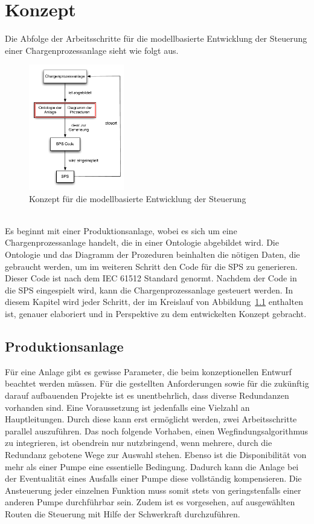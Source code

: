 
\chapter{Konzept} \label{chapter:architecture}
Die Abfolge der Arbeitsschritte für die modellbasierte Entwicklung der Steuerung einer Chargenprozessanlage sieht wie folgt aus.
\begin{figure}[h!]
		\centering
		\includegraphics[width=0.37\textwidth]{graphics/konzept/konzept_new.pdf}
		\caption{Konzept für die modellbasierte Entwicklung der Steuerung}
		\label{fig:konz_konzept_new}
\end{figure} \\
Es beginnt mit einer Produktionsanlage, wobei es sich um eine Chargenprozessanlage handelt, die in einer Ontologie abgebildet wird. Die Ontologie und das Diagramm der Prozeduren beinhalten die nötigen Daten, die gebraucht werden, um im weiteren Schritt den Code für die SPS zu generieren. Dieser Code ist nach dem IEC 61512 Standard genormt. Nachdem der Code in die SPS eingespielt wird, kann die Chargenprozessanlage gesteuert werden. 
In diesem Kapitel wird jeder Schritt, der im Kreislauf von Abbildung~\ref{fig:konz_konzept_new} enthalten ist, genauer elaboriert und in Perspektive zu dem entwickelten Konzept gebracht.
\section{Produktionsanlage}
Für eine Anlage gibt es gewisse Parameter, die beim konzeptionellen Entwurf beachtet werden müssen. Für die gestellten Anforderungen sowie für die zukünftig darauf aufbauenden Projekte ist es unentbehrlich, dass diverse Redundanzen vorhanden sind. Eine Voraussetzung ist jedenfalls eine Vielzahl an Hauptleitungen. Durch diese kann erst ermöglicht werden, zwei Arbeitsschritte parallel auszuführen. Das noch folgende Vorhaben, einen Wegfindungsalgorithmus zu integrieren, ist obendrein nur nutzbringend, wenn mehrere, durch die Redundanz gebotene Wege zur Auswahl stehen. Ebenso ist die Disponibilität von mehr als einer Pumpe eine essentielle Bedingung. Dadurch kann die Anlage bei der Eventualität eines Ausfalls einer Pumpe diese vollständig kompensieren. Die Ansteuerung jeder einzelnen Funktion muss somit stets von geringstenfalls einer anderen Pumpe durchführbar sein. Zudem ist es vorgesehen, auf ausgewählten Routen die Steuerung mit Hilfe der Schwerkraft durchzuführen.\\

